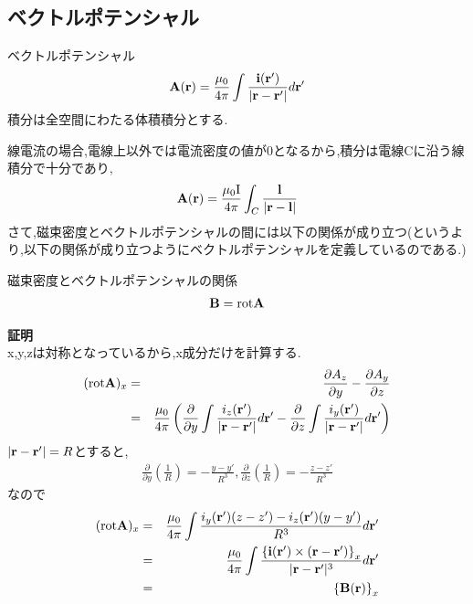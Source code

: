 \documentclass[../main]{subfiles}
\begin{document}
\subsection{ベクトルポテンシャル}
\begin{itembox}[c]{ベクトルポテンシャル}
\begin{eqnarray}
{\bf A}({\bf r})=\frac{\mu_0}{4 \pi} \int \frac{{\bf i}({\bf r'})}{|{\bf r}-{\bf r'}|} d{\bf r'}
\end{eqnarray}
積分は全空間にわたる体積積分とする.
\end{itembox}
線電流の場合,電線上以外では電流密度の値が0となるから,積分は電線Cに沿う線積分で十分であり,
\begin{eqnarray*}
{\bf A}({\bf r})=\frac{\mu_0 {\rm I}}{4 \pi} \int_{C}^{} \frac{{\bf l}}{|{\bf r}-{\bf l}|}
\end{eqnarray*}
さて,磁束密度とベクトルポテンシャルの間には以下の関係が成り立つ(というより,以下の関係が成り立つようにベクトルポテンシャルを定義しているのである.)
\begin{itembox}[c]{磁束密度とベクトルポテンシャルの関係}
\begin{eqnarray}
{\bf B}={\rm rot}{\bf A}
\end{eqnarray}
\end{itembox}
\newpage
{\bf 証明} \\
x,y,zは対称となっているから,x成分だけを計算する.
\begin{eqnarray*}
({\rm rot}{\bf A})_x &=& \frac{\partial A_z}{\partial y}-\frac{\partial A_y}{\partial z} \\
&=& \frac{\mu_0}{4 \pi} \left( \frac{\partial}{\partial y} \int \frac{i_z({\bf r'})}{|{\bf r}-{\bf r'}|} d{\bf r'} 
- \frac{\partial}{\partial z} \int \frac{i_y({\bf r'})}{|{\bf r}-{\bf r'}|} d{\bf r'} \right)
\end{eqnarray*}
$|{\bf r}-{\bf r'}|=R$とすると,
\begin{eqnarray*}
\frac{\partial}{\partial y}\left( \frac{1}{R} \right)=-\frac{y-y'}{R^3},\frac{\partial}{\partial z}\left( \frac{1}{R} \right)=-\frac{z-z'}{R^3}
\end{eqnarray*}
なので
\begin{eqnarray*}
({\rm rot}{\bf A})_x &=& \frac{\mu_0}{4 \pi} \int \frac{i_y({\bf r'})(z-z')-i_z({\bf r'})(y-y')}{R^3} d{\bf r'} \\ 
&=& \frac{\mu_0}{4 \pi} \int \frac{\left\{ {\bf i}({\bf r'}) \times ({\bf r}-{\bf r'}) \right\}_x }{|{\bf r}-{\bf r'}|^3} d{\bf r'} \\
&=& \left\{ {\bf B}({\bf r}) \right\}_x
\end{eqnarray*}
\end{document}
